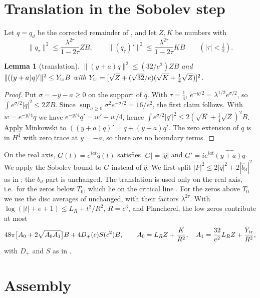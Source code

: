 \documentclass[11pt]{amsart}
\newtheorem{lemma}[proposition]{Lemma}
\theoremstyle{remark}
\numberwithin{equation}{section}
\begin{document}
\section{Translation in the Sobolev step}\label{sec:translation}

Let $q=q_d$ be the corrected remainder of \cite[Section~5]{MoriWeilIII}, and let $Z,K$ be numbers with
\[
\|q_\tau\|^2\le\frac{\lambda^{2\tau}}{1-2\tau}ZB,\qquad\|(q_\tau)'\|^2\le\frac{\lambda^{2\tau}}{1-2\tau}KB\qquad(|\tau|<\tfrac12).
\]

\begin{lemma}[translation]\label{lem:T}
$\|(y+a)q\|^2\le(32/e^2)ZB$ and $\|((y+a)q)'\|^2\le Y_{\rm tr}B$ with $Y_{\rm tr}=[\sqrt Z+(\sqrt{32}/e)(\sqrt K+\frac14\sqrt Z)]^2$.
\end{lemma}
\begin{proof}
Put $\sigma=-y-a\ge0$ on the support of $q$. With $\tau=\frac14$, $e^{-y/2}=\lambda^{1/2}e^{\sigma/2}$, so $\int e^{\sigma/2}|q|^2\le2ZB$. Since $\sup_{\sigma\ge0}\sigma^2e^{-\sigma/2}=16/e^2$, the first claim follows. With $w=e^{-y/4}q$ we have $e^{-y/4}q'=w'+w/4$, hence $\int e^{\sigma/2}|q'|^2\le2(\sqrt K+\frac14\sqrt Z)^2B$. Apply Minkowski to $((y+a)q)'=q+(y+a)q'$. The zero extension of $q$ is in $H^1$ with zero trace at $y=-a$, so there are no boundary terms.
\end{proof}

On the real axis, $G(t)=e^{iat}\hat q(t)$ satisfies $|G|=|\hat q|$ and $G'=ie^{iat}\widehat{(y+a)q}$. We apply the Sobolev bound \cite[(6.1)]{MoriWeilIII} to $G$ instead of $\hat q$. We first split $|F|^2\le2|\hat q|^2+2|\hat b_d|^2$ as in \cite{MoriWeilIII}; the $b_d$ part is unchanged. The translation is used only on the real axis, i.e.\ for the zeros below $T_0$, which lie on the critical line \cite{PT21}. For the zeros above $T_0$ we use the disc averages of \cite[Section~6]{MoriWeilIII} unchanged, with their factors $\lambda^{2\tau}$. With $\log(|t|+e+1)\le L_R+t^2/R^2$, $R=c^3$, and Plancherel, the low zeros contribute at most
\begin{equation}\label{eq:newL}
48\pi\bigl[A_0+2\sqrt{A_0A_1}\bigr]B+4D_+(c)S(c^2)B,\qquad A_0=L_RZ+\frac K{R^2},\quad A_1=\frac{32}{e^2}L_RZ+\frac{Y_{\rm tr}}{R^2},
\end{equation}
with $D_+$ and $S$ as in \cite[Appendix~A]{MoriWeilIII}.

\section{Assembly}\label{sec:assembly}
\end{document}
